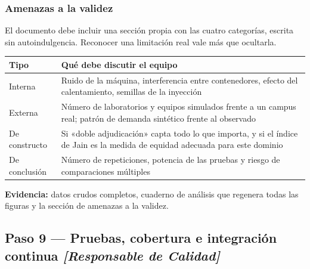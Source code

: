 \documentclass[11pt,a4paper]{article}
\newcommand{\paso}[1]{\subsection{#1}}
\begin{document}
	\subsubsection{Amenazas a la validez}
	
	El documento debe incluir una sección propia con las cuatro categorías, escrita sin autoindulgencia. Reconocer una limitación real vale más que ocultarla.
	
	\begin{center}
		\small
		\begin{tabular}{@{}p{3.0cm}p{11.9cm}@{}}
			\toprule
			\textbf{Tipo} & \textbf{Qué debe discutir el equipo} \\
			\midrule
			Interna & Ruido de la máquina, interferencia entre contenedores, efecto del calentamiento, semillas de la inyección \\
			\addlinespace
			Externa & Número de laboratorios y equipos simulados frente a un campus real; patrón de demanda sintético frente al observado \\
			\addlinespace
			De constructo & Si «doble adjudicación» capta todo lo que importa, y si el índice de Jain es la medida de equidad adecuada para este dominio \\
			\addlinespace
			De conclusión & Número de repeticiones, potencia de las pruebas y riesgo de comparaciones múltiples \\
			\bottomrule
		\end{tabular}
	\end{center}
	
	\textbf{Evidencia:} datos crudos completos, cuaderno de análisis que regenera todas las figuras y la sección de amenazas a la validez.
	
	\paso{Paso 9 --- Pruebas, cobertura e integración continua \emph{[Responsable de Calidad]}}
	
\end{document}
